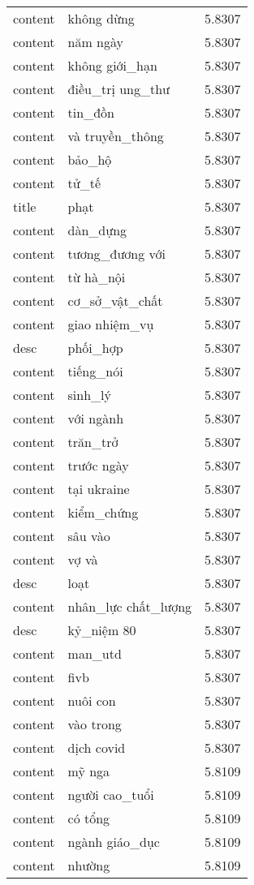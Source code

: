 \documentclass{article}
\begin{document}
\begin{tabular}{lll}
content & không dừng & 5.8307\\
content & năm ngày & 5.8307\\
content & không giới\_hạn & 5.8307\\
content & điều\_trị ung\_thư & 5.8307\\
content & tin\_đồn & 5.8307\\
content & và truyền\_thông & 5.8307\\
content & bảo\_hộ & 5.8307\\
content & tử\_tế & 5.8307\\
title & phạt & 5.8307\\
content & dàn\_dựng & 5.8307\\
content & tương\_đương với & 5.8307\\
content & từ hà\_nội & 5.8307\\
content & cơ\_sở\_vật\_chất & 5.8307\\
content & giao nhiệm\_vụ & 5.8307\\
desc & phối\_hợp & 5.8307\\
content & tiếng\_nói & 5.8307\\
content & sinh\_lý & 5.8307\\
content & với ngành & 5.8307\\
content & trăn\_trở & 5.8307\\
content & trước ngày & 5.8307\\
content & tại ukraine & 5.8307\\
content & kiểm\_chứng & 5.8307\\
content & sâu vào & 5.8307\\
content & vợ và & 5.8307\\
desc & loạt & 5.8307\\
content & nhân\_lực chất\_lượng & 5.8307\\
desc & kỷ\_niệm 80 & 5.8307\\
content & man\_utd & 5.8307\\
content & fivb & 5.8307\\
content & nuôi con & 5.8307\\
content & vào trong & 5.8307\\
content & dịch covid & 5.8307\\
content & mỹ nga & 5.8109\\
content & người cao\_tuổi & 5.8109\\
content & có tổng & 5.8109\\
content & ngành giáo\_dục & 5.8109\\
content & nhường & 5.8109\\

\end{tabular}
\end{document}
